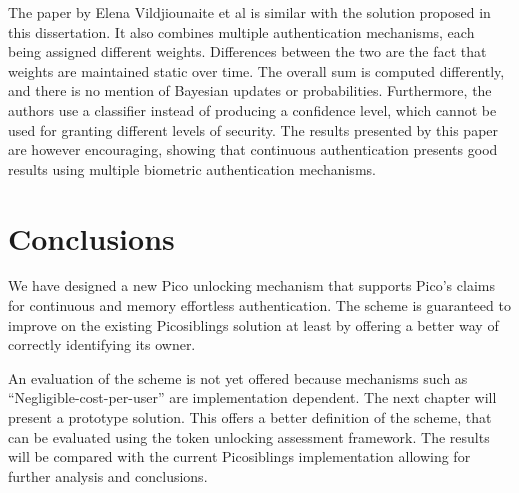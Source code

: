 The paper by Elena Vildjiounaite et al \cite{vildjiounaite2007increasing} is similar with the solution proposed in this dissertation. It also combines multiple authentication mechanisms, each being assigned different weights. Differences between the two are the fact that weights are maintained static over time. The overall sum is computed differently, and there is no mention of Bayesian updates or probabilities. Furthermore, the authors use a classifier instead of producing a confidence level, which cannot be used for granting different levels of security. The results presented by this paper are however encouraging, showing that continuous authentication presents good results using multiple biometric authentication mechanisms.

\section{Conclusions}
We have designed a new Pico unlocking mechanism that supports Pico's claims for continuous and memory effortless authentication. The scheme is guaranteed to improve on the existing Picosiblings solution at least by offering a better way of correctly identifying its owner.  

An evaluation of the scheme is not yet offered because mechanisms such as ``Negligible-cost-per-user'' are implementation dependent. The next chapter will present a prototype solution. This offers a better definition of the scheme, that can be evaluated using the token unlocking assessment framework. The results will be compared with the current Picosiblings implementation allowing for further analysis and conclusions.


